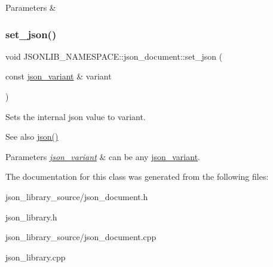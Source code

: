 \begin{DoxyParams}{Parameters}
{\em } & \\
\hline
\end{DoxyParams}
\mbox{\label{classJSONLIB__NAMESPACE_1_1json__document_ae6c52de0f1b1b6e5825f9555b6026e1b}} 
\subsubsection{\texorpdfstring{set\+\_\+json()}{set\_json()}\hspace{0.1cm}{\footnotesize\ttfamily [4/4]}}
{\footnotesize\ttfamily void J\+S\+O\+N\+L\+I\+B\+\_\+\+N\+A\+M\+E\+S\+P\+A\+C\+E\+::json\+\_\+document\+::set\+\_\+json (\begin{DoxyParamCaption}\item[{const \hyperlink{classJSONLIB__NAMESPACE_1_1json__variant}{json\+\_\+variant} \&}]{variant }\end{DoxyParamCaption})}



Sets the internal json value to {\ttfamily variant}. 

\begin{DoxySeeAlso}{See also}
\hyperlink{classJSONLIB__NAMESPACE_1_1json__document_ad87b8e7d68ba854dbd730758273a3b93}{json()} 
\end{DoxySeeAlso}

\begin{DoxyParams}{Parameters}
{\em \hyperlink{classJSONLIB__NAMESPACE_1_1json__variant}{json\+\_\+variant}} & can be any \hyperlink{classJSONLIB__NAMESPACE_1_1json__variant}{json\+\_\+variant}. \\
\hline
\end{DoxyParams}


The documentation for this class was generated from the following files\+:\begin{DoxyCompactItemize}
\item 
json\+\_\+library\+\_\+source/json\+\_\+document.\+h\item 
json\+\_\+library.\+h\item 
json\+\_\+library\+\_\+source/json\+\_\+document.\+cpp\item 
json\+\_\+library.\+cpp\end{DoxyCompactItemize}
